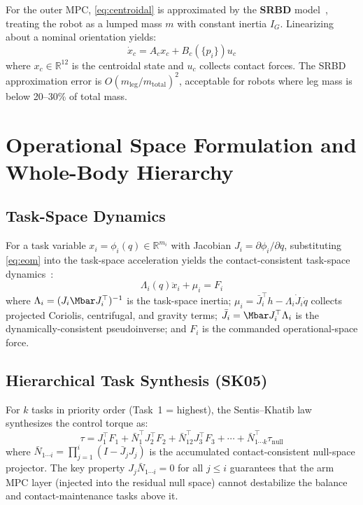 For the outer MPC, \eqref{eq:centroidal} is approximated by the
\textbf{SRBD} model~\cite{dicarlo2018dynamic}, treating the robot as a
lumped mass $m$ with constant inertia $I_G$. Linearizing about a nominal
orientation yields:
\begin{equation}\label{eq:SRBD}
  \dot{x}_c = A_c x_c + B_c(\{p_i\})u_c
\end{equation}
where $x_c\in\mathbb{R}^{12}$ is the centroidal state and $u_c$ collects
contact forces. The SRBD approximation error is
$O(m_{\text{leg}}/m_{\text{total}})^2$, acceptable for robots where leg
mass is below 20--30\% of total mass.

\section{Operational Space Formulation and Whole-Body Hierarchy}
\label{sec:osf}

\subsection{Task-Space Dynamics}

For a task variable $x_i=\phi_i(q)\in\mathbb{R}^{m_i}$ with Jacobian
$J_i=\partial\phi_i/\partial q$, substituting \eqref{eq:eom} into the
task-space acceleration yields the contact-consistent task-space
dynamics~\cite{khatib1987unified,righetti2011inverse}:
\begin{equation}\label{eq:taskdyn}
  \Lambda_i(q)\ddot{x}_i + \mu_i = F_i
\end{equation}
where $\Lambda_i=(J_i\Mbar J_i^\top)^{-1}$ is the task-space inertia;
$\mu_i=\bar{J}_i^\top h - \Lambda_i\dot{J}_i\dot{q}$ collects projected
Coriolis, centrifugal, and gravity terms; $\bar{J}_i=\Mbar J_i^\top\Lambda_i$
is the dynamically-consistent pseudoinverse; and $F_i$ is the commanded
operational-space force.

\subsection{Hierarchical Task Synthesis (SK05)}

For $k$ tasks in priority order (Task~1 = highest), the Sentis--Khatib
law~\cite{sentis2005synthesis} synthesizes the control torque as:
\begin{equation}\label{eq:SK05}
  \tau = J_1^\top F_1 + \bar{N}_1^\top J_2^\top F_2
       + \bar{N}_{12}^\top J_3^\top F_3 + \cdots
       + \bar{N}_{1\cdots k}^\top\tau_{\text{null}}
\end{equation}
where $\bar{N}_{1\cdots i}=\prod_{j=1}^{i}(I-\bar{J}_jJ_j)$ is the
accumulated contact-consistent null-space projector.
The key property $J_j\bar{N}_{1\cdots i}=0$ for all $j\leq i$ guarantees
that the arm MPC layer (injected into the residual null space) cannot
destabilize the balance and contact-maintenance tasks above it.

